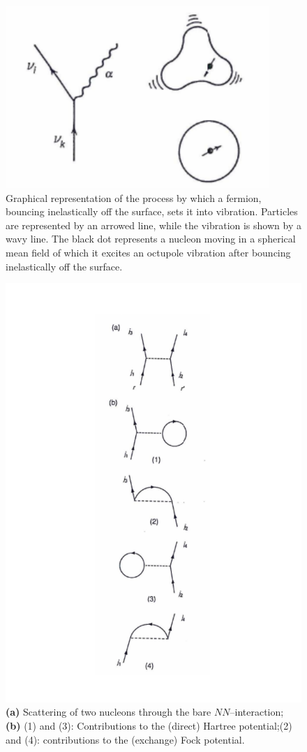 \documentclass[a4paper,11pt]{book}
\numberwithin{equation}{section}
\numberwithin{figure}{section}
\numberwithin{table}{section}
\begin{document}
\begin{figure}
\centerline {
\includegraphics*[width=10cm]{introduccion/figs/figpreface5}
}
\caption{Graphical representation of the process       by which a fermion, bouncing inelastically off the surface, sets it into vibration. Particles are represented by an arrowed line, while the vibration is shown by a wavy line. The black dot represents a nucleon moving in a spherical mean field of which it excites an octupole vibration after bouncing inelastically off the surface.}
\label{fig1.0.5}
\end{figure}
\begin{figure}
\centerline {
\includegraphics*[width=12cm]{introduccion/figs/figpreface6}
}
\caption{\textbf{(a)} Scattering of two nucleons through the bare $NN$--interaction; \textbf{(b)} (1) and (3): Contributions to the (direct) Hartree potential;(2) and (4): contributions to the (exchange) Fock potential.}
\label{fig1.0.6}
\end{figure}
\end{document}
